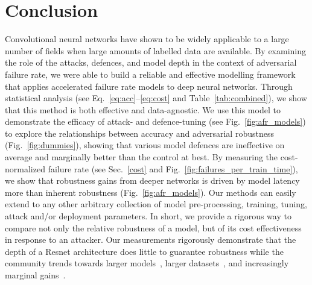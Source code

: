 \section{Conclusion}
Convolutional neural networks have shown to be widely applicable to a large number of fields when large amounts of labelled data are available. By examining the role of the attacks, defences, and model depth in the context of adversarial failure rate, we were able to build a reliable and effective modelling framework that applies accelerated failure rate models to deep neural networks. Through statistical analysis (see Eq.~\ref{eq:acc}--\ref{eq:cost} and Table~\ref{tab:combined}), we show that this method is both effective and data-agnostic.  We use this model to demonstrate the efficacy of attack- and defence-tuning (see Fig.~\ref{fig:afr_models}) to  explore the relationships between accuracy and adversarial robustness (Fig.~\ref{fig:dummies}), showing that various model defences are ineffective on average and marginally better than the control at best.
By measuring the cost-normalized failure rate (see Sec.~\ref{cost} and Fig.~\ref{fig:failures_per_train_time}), we show that robustness gains from deeper networks is driven by model latency more than inherent robustness (Fig.~\ref{fig:afr_models}). Our methods can easily extend to any other arbitrary collection of model pre-processing, training, tuning, attack and/or deployment parameters. In short, we provide a rigorous way to compare not only the relative robustness of a model, but of its cost effectiveness in response to an attacker. Our measurements rigorously demonstrate  that the depth of a Resnet architecture does little to guarantee robustness while the community trends towards larger models~\cite{desislavov2021compute}, larger datasets~\cite{desislavov2021compute,bailly2022effects}, and increasingly marginal gains~\cite{sun2017revisiting}.
